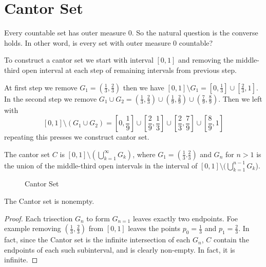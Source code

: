 \section{Cantor Set}
Every countable set has outer measure $0$. So the natural question is the converse holds. In other word, is every set with outer measure  $0$ countable?

To construct a cantor set we start with interval $[0,1]$ and removing the middle-third open interval at each step of remaining intervals from previous step.

At first step we remove  $G_1=(\frac{1}{3},\frac{2}{3})$ then we have $[0,1]\setminus G_1=[0,\frac{1}{3}]\cup[\frac{2}{3},1]$.\\
In the second step we remove $G_1\cup G_2=(\frac{1}{3},\frac{2}{3})\cup(\frac{1}{9},\frac{2}{9})\cup(\frac{7}{9},\frac{8}{9})$. Then we left with 
\[
    \left[ 0,1 \right]\setminus (G_1\cup G_2) = \left[0,\frac{1}{9}\right]\cup\left[ \frac{2}{9},\frac{1}{3} \right] \cup \left[ \frac{2}{3},\frac{7}{9} \right] \cup\left[ \frac{8}{9},1\right] 
\]
repeating this presses we construct cantor set.

\begin{definition}
    The cantor set $C$ is  $[0,1]\setminus (\bigcup_{k=1}^{\infty}G_k)$, where $G_1=(\frac{1}{3}.\frac{2}{3})$ and $G_n$ for  $n>1$ is the union of the middle-third
    open intervals in the interval of  $[0,1]\setminus (\bigcup_{k=1}^{n-1}G_k$).
\end{definition}
\begin{figure}[!h]
    \centering
    \caption{Cantor Set}
\end{figure}

\begin{theorem}
    The Cantor set is nonempty.
\end{theorem}
\begin{proof}
    Each trisection $G_n$ to form  $G_{n=1}$ leaves exactly two endpoints. Foe example removing  $\left( \frac{1}{3},\frac{2}{3} \right) $ from $[0,1]$ leaves the points
     $p_0=\frac{1}{3}$ and $p_1=\frac{2}{3}$. In fact, since the Cantor set is the infinite intersection of each $G_n$,  $C$ contain the endpoints of each such subinterval,
     and is clearly non-empty. In fact, it is infinite.
\end{proof}

